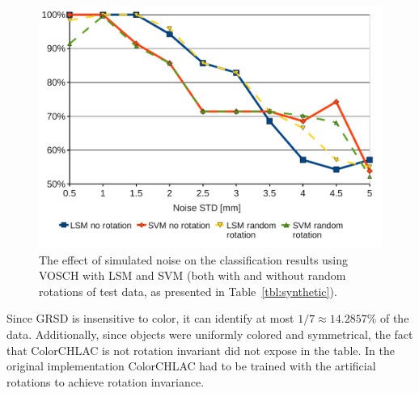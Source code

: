 \documentclass[conference]{sty/IEEEtran}
\begin{document}
\begin{figure}[htb!]
  \begin{center}
    \includegraphics[width=.98\columnwidth]{figures/comparison/vosch.pdf}
    \caption{The effect of simulated noise on the classification results using VOSCH with LSM and SVM
             (both with and without random rotations of test data, as presented in Table~\ref{tbl:synthetic}).}
    \label{fig:plot}
  \end{center}
\end{figure}

Since GRSD is insensitive to color, it can identify at most $1/7 \approx 14.2857\%$ of the data.
Additionally, since objects were uniformly colored and symmetrical, the fact that ColorCHLAC 
is not rotation invariant did not expose in the table. In the original implementation ColorCHLAC 
had to be trained with the artificial rotations to achieve rotation invariance.
\end{document}
